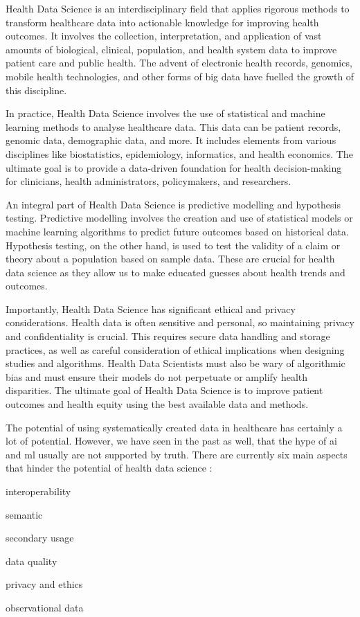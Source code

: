 Health Data Science is an interdisciplinary field that applies rigorous methods to transform healthcare data into actionable knowledge for improving health outcomes. It involves the collection, interpretation, and application of vast amounts of biological, clinical, population, and health system data to improve patient care and public health. The advent of electronic health records, genomics, mobile health technologies, and other forms of big data have fuelled the growth of this discipline.

In practice, Health Data Science involves the use of statistical and machine learning methods to analyse healthcare data. This data can be patient records, genomic data, demographic data, and more. It includes elements from various disciplines like biostatistics, epidemiology, informatics, and health economics. The ultimate goal is to provide a data-driven foundation for health decision-making for clinicians, health administrators, policymakers, and researchers.

An integral part of Health Data Science is predictive modelling and hypothesis testing. Predictive modelling involves the creation and use of statistical models or machine learning algorithms to predict future outcomes based on historical data. Hypothesis testing, on the other hand, is used to test the validity of a claim or theory about a population based on sample data. These are crucial for health data science as they allow us to make educated guesses about health trends and outcomes.

Importantly, Health Data Science has significant ethical and privacy considerations. Health data is often sensitive and personal, so maintaining privacy and confidentiality is crucial. This requires secure data handling and storage practices, as well as careful consideration of ethical implications when designing studies and algorithms. Health Data Scientists must also be wary of algorithmic bias and must ensure their models do not perpetuate or amplify health disparities. The ultimate goal of Health Data Science is to improve patient outcomes and health equity using the best available data and methods.


The potential of using systematically created data in healthcare has certainly a lot of potential. However, we have seen in the past as well, that the hype of \ac{ai} and \ac{ml} usually are not supported by truth. There are currently six main aspects that hinder the potential of health data science \cite{panchInconvenientTruthAI2019,peekThreeControversiesHealth2018}:
\begin{myitemize}
    \item interoperability
    \item semantic
    \item secondary usage
    \item data quality
    \item privacy and ethics
    \item observational data
\end{myitemize}


